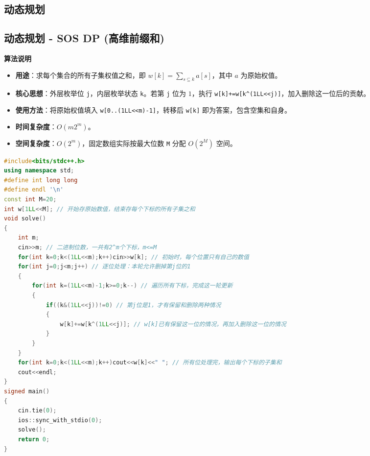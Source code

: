 \documentclass[10pt,landscape,a4paper]{article}
\begin{document}
\tableofcontents
\clearpage
\begin{multicols*}{3}
\raggedcolumns
\section*{动态规划}
\subsection*{动态规划 - SOS DP (高维前缀和)}
\par\addvspace{0.7ex}\noindent\textbf{算法说明}\par\nobreak
\begin{itemize}
\item \textbf{用途}：求每个集合的所有子集权值之和，即 $w[k]=\sum_{s\subseteq k}a[s]$，其中 $a$ 为原始权值。
\item \textbf{核心思想}：外层枚举位 \texttt{j}，内层枚举状态 \texttt{k}。若第 \texttt{j} 位为 $1$，执行 \texttt{w\allowbreak{}[\allowbreak{}k\allowbreak{}]\allowbreak{}+\allowbreak{}=\allowbreak{}w\allowbreak{}[\allowbreak{}k\allowbreak{}\textasciicircum{}\allowbreak{}(\allowbreak{}1\allowbreak{}L\allowbreak{}L\allowbreak{}\textless{}\allowbreak{}\textless{}\allowbreak{}j\allowbreak{})\allowbreak{}]}，加入删除这一位后的贡献。
\item \textbf{使用方法}：将原始权值填入 \texttt{w\allowbreak{}[\allowbreak{}0\allowbreak{}.\allowbreak{}.\allowbreak{}(\allowbreak{}1\allowbreak{}L\allowbreak{}L\allowbreak{}\textless{}\allowbreak{}\textless{}\allowbreak{}m\allowbreak{})\allowbreak{}-\allowbreak{}1\allowbreak{}]}，转移后 \texttt{w\allowbreak{}[\allowbreak{}k\allowbreak{}]} 即为答案，包含空集和自身。
\item \textbf{时间复杂度}：$O(m2^m)$。
\item \textbf{空间复杂度}：$O(2^m)$，固定数组实际按最大位数 \texttt{M} 分配 $O(2^M)$ 空间。
\end{itemize}
\par{}\par
\begin{lstlisting}[language=C++]
#include<bits/stdc++.h>
using namespace std;
#define int long long
#define endl '\n'
const int M=20;
int w[1LL<<M]; // 开始存原始数值，结束存每个下标的所有子集之和
void solve()
{
    int m;
    cin>>m; // 二进制位数，一共有2^m个下标，m<=M
    for(int k=0;k<(1LL<<m);k++)cin>>w[k]; // 初始时，每个位置只有自己的数值
    for(int j=0;j<m;j++) // 逐位处理：本轮允许删掉第j位的1
    {
        for(int k=(1LL<<m)-1;k>=0;k--) // 遍历所有下标，完成这一轮更新
        {
            if((k&(1LL<<j))!=0) // 第j位是1，才有保留和删除两种情况
            {
                w[k]+=w[k^(1LL<<j)]; // w[k]已有保留这一位的情况，再加入删除这一位的情况
            }
        }
    }
    for(int k=0;k<(1LL<<m);k++)cout<<w[k]<<" "; // 所有位处理完，输出每个下标的子集和
    cout<<endl;
}
signed main()
{
    cin.tie(0);
    ios::sync_with_stdio(0);
    solve();
    return 0;
}
\end{lstlisting}

\end{multicols*}
\end{document}
